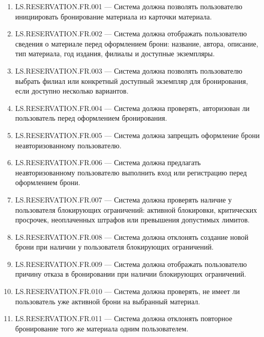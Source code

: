 \documentclass[12pt,a4paper]{article}
\begin{document}
	\begin{enumerate}
		\item LS.RESERVATION.FR.001 --- Система должна позволять пользователю
		инициировать бронирование материала из карточки материала.
		
		\item LS.RESERVATION.FR.002 --- Система должна отображать пользователю
		сведения о материале перед оформлением брони: название, автора, описание,
		тип материала, год издания, филиалы и доступные экземпляры.
		
		\item LS.RESERVATION.FR.003 --- Система должна позволять пользователю выбрать
		филиал или конкретный доступный экземпляр для бронирования, если доступно
		несколько вариантов.
		
		\item LS.RESERVATION.FR.004 --- Система должна проверять, авторизован ли
		пользователь перед оформлением бронирования.
		
		\item LS.RESERVATION.FR.005 --- Система должна запрещать оформление брони
		неавторизованному пользователю.
		
		\item LS.RESERVATION.FR.006 --- Система должна предлагать неавторизованному
		пользователю выполнить вход или регистрацию перед оформлением брони.
		
		\item LS.RESERVATION.FR.007 --- Система должна проверять наличие у пользователя
		блокирующих ограничений: активной блокировки, критических просрочек,
		неоплаченных штрафов или превышения допустимых лимитов.
		
		\item LS.RESERVATION.FR.008 --- Система должна отклонять создание новой брони
		при наличии у пользователя блокирующих ограничений.
		
		\item LS.RESERVATION.FR.009 --- Система должна отображать пользователю причину
		отказа в бронировании при наличии блокирующих ограничений.
		
		\item LS.RESERVATION.FR.010 --- Система должна проверять, не имеет ли
		пользователь уже активной брони на выбранный материал.
		
		\item LS.RESERVATION.FR.011 --- Система должна отклонять повторное бронирование
		того же материала одним пользователем.
		

\end{enumerate}
\end{document}
